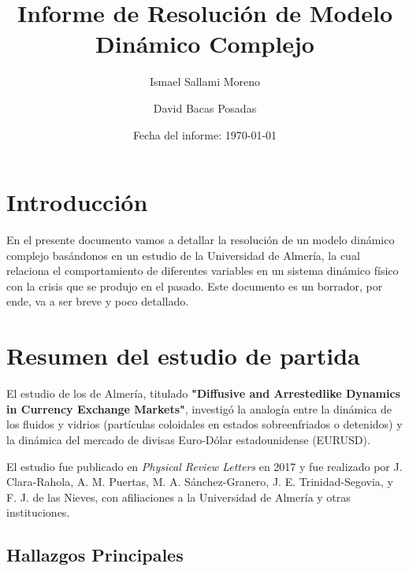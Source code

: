 \documentclass[12pt,a4paper]{article}
\title{Informe de Resolución de Modelo Dinámico Complejo}
\author[1]{Ismael Sallami Moreno}
\author[2]{David Bacas Posadas}
\affil[1]{Doble Grado en Ingeniería Informática y Administración y Dirección de Empresas, Universidad de Granada, España}
\date{Fecha del informe: \today}
\begin{document}
\maketitle



\section{Introducción}
En el presente documento vamos a detallar la resolución de un modelo dinámico complejo basándonos en un estudio de la Universidad de Almería, la cual relaciona el comportamiento de diferentes variables en un sistema dinámico físico con la crisis que se produjo en el pasado. Este documento es un borrador, por ende, va a ser breve y poco detallado.

\section{Resumen del estudio de partida}

El estudio de los de Almería, titulado \textbf{"Diffusive and Arrestedlike Dynamics in Currency Exchange Markets"}, investigó la analogía entre la dinámica de los fluidos y vidrios (partículas coloidales en estados sobreenfriados o detenidos) y la dinámica del mercado de divisas Euro-Dólar estadounidense (EURUSD).

El estudio fue publicado en \emph{Physical Review Letters} en 2017 y fue realizado por J. Clara-Rahola, A. M. Puertas, M. A. Sánchez-Granero, J. E. Trinidad-Segovia, y F. J. de las Nieves, con afiliaciones a la Universidad de Almería y otras instituciones.

\subsection*{Hallazgos Principales}
\end{document}
